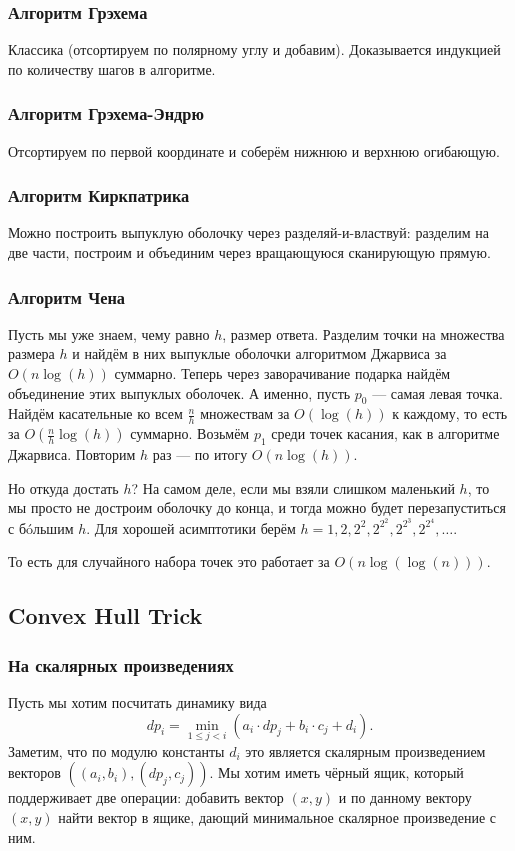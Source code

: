 \subsubsection{Алгоритм Грэхема}
Классика (отсортируем по полярному углу и добавим).
Доказывается индукцией по количеству шагов в алгоритме.

\subsubsection{Алгоритм Грэхема-Эндрю}
Отсортируем по первой координате и соберём нижнюю и верхнюю огибающую.

\subsubsection{Алгоритм Киркпатрика}
Можно построить выпуклую оболочку через разделяй-и-властвуй: разделим на две части, построим и объединим через вращающуюся сканирующую прямую.

\subsubsection{Алгоритм Чена}
Пусть мы уже знаем, чему равно $h$, размер ответа.
Разделим точки на множества размера $h$ и найдём в них выпуклые оболочки алгоритмом Джарвиса за $O(n \log(h))$ суммарно.
Теперь через заворачивание подарка найдём объединение этих выпуклых оболочек.
А именно, пусть $p_0$ --- самая левая точка.
Найдём касательные ко всем $\frac{n}{h}$ множествам за $O(\log(h))$ к каждому, то есть за $O \left( \frac{n}{h} \log(h) \right)$ суммарно.
Возьмём $p_1$ среди точек касания, как в алгоритме Джарвиса.
Повторим $h$ раз --- по итогу $O(n \log(h))$.

Но откуда достать $h$?
На самом деле, если мы взяли слишком маленький $h$, то мы просто не достроим оболочку до конца, и тогда можно будет перезапуститься с бóльшим $h$.
Для хорошей асимптотики берём $h = 1, 2, 2^2, 2^{2^2}, 2^{2^3}, 2^{2^4}, \dots$.

То есть для случайного набора точек это работает за $O(n \log(\log(n)))$.

\subsection{Convex Hull Trick}
\subsubsection{На скалярных произведениях}
Пусть мы хотим посчитать динамику вида
\[
    dp_i = \min_{1 \le j < i} (a_i \cdot dp_j + b_i \cdot c_j + d_i).
\]
Заметим, что по модулю константы $d_i$ это является скалярным произведением векторов $((a_i, b_i), (dp_j, c_j))$.
Мы хотим иметь чёрный ящик, который поддерживает две операции: добавить вектор $(x, y)$ и по данному вектору $(x, y)$ найти вектор в ящике, дающий минимальное скалярное произведение с ним.

